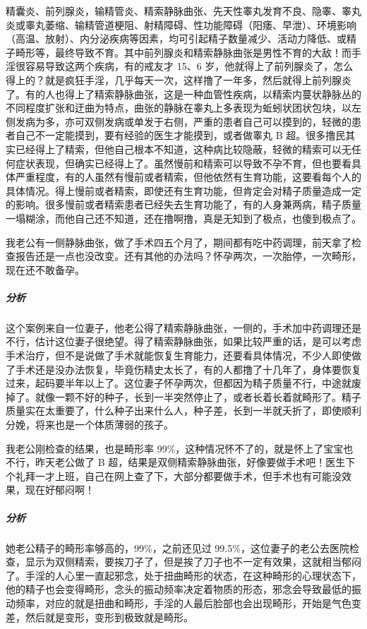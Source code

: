 精囊炎、前列腺炎，输精管炎、精索静脉曲张、先天性睾丸发育不良、隐睾、睾丸炎或睾丸萎缩、输精管道梗阻、射精障碍、性功能障碍（阳痿、早泄）、环境影响（高温、放射）、内分泌疾病等因素，均可引起精子数量减少、活动力降低、或精子畸形等，最终导致不育。其中前列腺炎和精索静脉曲张是男性不育的大敌！而手淫很容易导致这两个疾病，有的戒友才 15、6 岁，他就得上了前列腺炎了，怎么得上的？就是疯狂手淫，几乎每天一次，这样撸了一年多，然后就得上前列腺炎了。有的人也得上了精索静脉曲张，这是一种血管性疾病，以精索内蔓状静脉丛的不同程度扩张和迂曲为特点，曲张的静脉在睾丸上多表现为蚯蚓状团状包块，以左侧发病为多，亦可双侧发病或单发于右侧，严重的患者自己可以摸到的，轻微的患者自己不一定能摸到，要有经验的医生才能摸到，或者做睾丸 B 超。很多撸民其实已经得上了精索，但他自己根本不知道，这种病比较隐蔽，轻微的精索可以无任何症状表现，但确实已经得上了。虽然慢前和精索可以导致不孕不育，但也要看具体严重程度，有的人虽然有慢前或者精索，但他依然有生育功能，这要看每个人的具体情况。得上慢前或者精索，即使还有生育功能，但肯定会对精子质量造成一定的影响。很多慢前或者精索患者已经失去生育功能了，有的人身兼两病，精子质量一塌糊涂，而他自己还不知道，还在撸啊撸，真是无知到了极点，也傻到极点了。

\begin{case}[不孕不育]
    我老公有一侧静脉曲张，做了手术四五个月了，期间都有吃中药调理，前天拿了检查报告还是一点也没改变。还有其他的办法吗？怀孕两次，一次胎停，一次畸形，现在还不敢备孕。
    \subparagraph{分析} 这个案例来自一位妻子，他老公得了精索静脉曲张，一侧的，手术加中药调理还是不行，估计这位妻子很绝望。得了精索静脉曲张，如果比较严重的话，是可以考虑手术治疗，但不是说做了手术就能恢复生育能力，还要看具体情况，不少人即使做了手术还是没办法恢复，毕竟伤精史太长了，有的人都撸了十几年了，身体要恢复过来，起码要半年以上了。这位妻子怀孕两次，但都因为精子质量不行，中途就废掉了。就像一颗不好的种子，长到一半突然停止了，或者长着长着就畸形了。精子质量实在太重要了，什么种子出来什么人，种子差，长到一半就夭折了，即使顺利分娩，将来也是一个体质薄弱的孩子。
\end{case}

\begin{case}[不孕不育]
    我老公刚检查的结果，也是畸形率 99\%，这种情况怀不了的，就是怀上了宝宝也不行，昨天老公做了 B 超，结果是双侧精索静脉曲张，好像要做手术吧！医生下个礼拜一才上班，自己在网上查了下，大部分都要做手术，但手术也有可能没效果，现在好郁闷啊！
    \subparagraph{分析} 她老公精子的畸形率够高的，99\%，之前还见过 99.5\%，这位妻子的老公去医院检查，显示为双侧精索，要挨刀子了，但是挨了刀子也不一定有效果，这就相当郁闷了。手淫的人心里一直起邪念，处于扭曲畸形的状态，在这种畸形的心理状态下，他的精子也会变得畸形，念头的振动频率决定着物质的形态，邪念会导致最低的振动频率，对应的就是扭曲和畸形，手淫的人最后脸部也会出现畸形，开始是气色变差，然后就是变形，变形到极致就是畸形。
\end{case}

